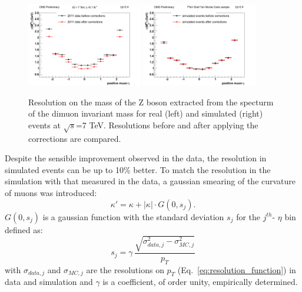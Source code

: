\begin{figure}[hbtp]  
\begin{center}
\includegraphics[width=0.45\textwidth]{figures/TkAl_Style/Data2011_44X/SigmaVsEtaPlus}
\includegraphics[width=0.45\textwidth]{figures/TkAl_Style/MC2011_44X/SigmaVsEtaPlus}
 \hspace{1cm} 
   \caption{Resolution on the mass of the Z boson extracted from the specturm of the dimuon
     invariant mass for real (left) and simulated (right) events at
     $\sqrt{s}$=7 TeV. Resolutions before and after applying the
     corrections are compared.
   \label{fig:SigmaVsEta_44X}}
 \end{center}
\end{figure} 
Despite the sensible improvement observed in the
data, the resolution in simulated events can be up to 10\%
better. To match the resolution in the simulation with that
measured in the data, a gaussian smearing 
of the curvature of muons was introduced:
\begin{equation}
\kappa' = \kappa + |\kappa| \cdot G(0,s_j).
\label{eq:smearing}
\end{equation} 
$G(0,s_j)$ is a gaussian function with the standard
deviation $s_j$ for the $j^{th}$- $\eta$ bin defined  as:
\[
s_j = \gamma \, \frac{\sqrt{\sigma^2_{data,j}-\sigma^2_{MC,j}}}{p_T}
\] 
with $\sigma_{data,j}$ and $\sigma_{MC,j}$ are the resolutions on
$p_T$ (Eq.~\ref{eq:resolution_function}) in data and simulation and $\gamma$ is a
coefficient, of order unity, empirically determined. 

